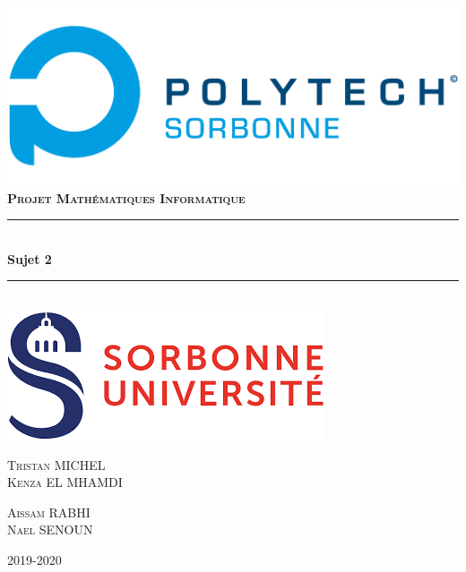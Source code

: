 \documentclass{article}
\newcommand{\HRule}{\rule{\linewidth}{0.5mm}}
\begin{document}

\begin{titlepage}
    \begin{sffamily}
        \begin{center}
        
            \includegraphics[scale=0.2]{../img/Logo_Polytech_Sorbonne.png}\\[1.5cm]
            \textsc{\Large \bfseries{Projet Mathématiques Informatique}}\\[1.5cm]
            \HRule \\[0.4cm]
            { \huge \bfseries Sujet 2\\[0.4cm]}
            \HRule \\[2cm]
            \includegraphics[scale=0.4]{../img/su.png}\\[2cm]
            \begin{minipage}{0.4\textwidth}
                \begin{flushleft} \large
                    \textsc{Tristan MICHEL\\ Kenza EL MHAMDI }
                \end{flushleft}
            \end{minipage}
            \begin{minipage}{0.4\textwidth}
                \begin{flushright} \large
                    \textsc{Aissam RABHI\\ Nael SENOUN    }
                \end{flushright}
            \end{minipage}
            \vfill
        
            {\large 2019-2020}
            
        \end{center}
    \end{sffamily}
\end{titlepage}
\end{document}
